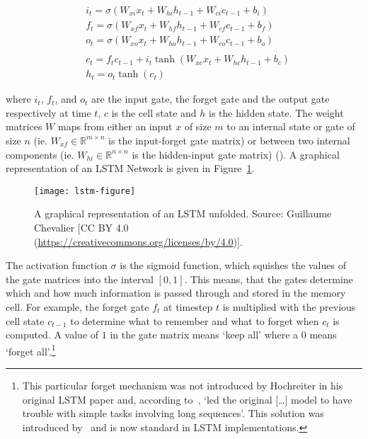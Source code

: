 \begin{align*}
    & i_{t} = \sigma(W_{xi}x_{t} + W_{hi}h_{t-1} + W_{ci}c_{t-1} + b_{i})    \\
    & f_{t} = \sigma(W_{xf}x_{t} + W_{hf}h_{t-1} + W_{cf}c_{t-1} + b_{f})    \\
    & o_{t} = \sigma(W_{xo}x_{t} + W_{ho}h_{t-1} + W_{co}c_{t-1} + b_{o})    \\ \\
    & c_{t} = f_{t}c_{t-1} + i_{t}\tanh(W_{xc}x_{t} + W_{hc}h_{t-1} + b_{c}) \\
    & h_{t} = o_{t}\tanh(c_{t})
\end{align*}

where $i_{t}$, $f_{t}$, and $o_{t}$ are the input gate, the forget gate and the
output gate respectively at time $t$, $c$ is the cell state and $h$ is the
hidden state. The weight matrices $W$ maps from either an input $x$ of size $m$
to an internal state or gate of size $n$ (ie. $W_{xf} \in \mathbb{R}^{m \times
n}$ is the input-forget gate matrix) or between two internal components (ie.
$W_{hi} \in \mathbb{R}^{n \times n}$ is the hidden-input gate matrix)
(\cite{huang2015bidirectional}). A graphical representation of an LSTM Network
is given in Figure~\ref{fig:lstm}.

\begin{figure}[h]
    \texttt{[image: lstm-figure]}
    \caption{A graphical representation of an LSTM unfolded. Source: Guillaume
        Chevalier [CC BY 4.0 (\url{https://creativecommons.org/licenses/by/4.0})].
    }\label{fig:lstm}
\end{figure}

The activation function $\sigma$ is the sigmoid function, which squishes the
values of the gate matrices into the interval $[0,1]$. This means, that the
gates determine which and how much information is passed through and stored in
the memory cell. For example, the forget gate $f_{t}$ at timestep $t$ is
multiplied with the previous cell state $c_{t-1}$ to determine what to remember
and what to forget when $c_{t}$ is computed. A value of $1$ in the gate matrix
means `keep all' where a $0$ means `forget all'.\footnote{This particular forget
    mechanism was not introduced by Hochreiter in his original LSTM paper and,
    according to~\cite{pitis2016lstm}, `led the original [\ldots] model to have
    trouble with simple tasks involving long sequences'. This solution was
    introduced by~\cite{gers1999learning} and is now standard in LSTM
implementations.}

